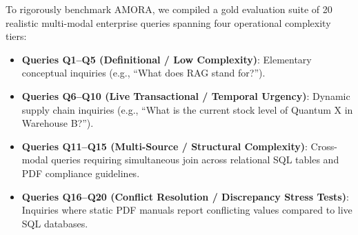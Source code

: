 \documentclass[fleqn,10pt]{article}
\begin{document}
To rigorously benchmark AMORA, we compiled a gold evaluation suite of 20 realistic multi-modal enterprise queries spanning four operational complexity tiers:
\begin{itemize}[leftmargin=1.5em,noitemsep]
    \item \textbf{Queries Q1--Q5 (Definitional / Low Complexity)}: Elementary conceptual inquiries (e.g., ``What does RAG stand for?'').
    \item \textbf{Queries Q6--Q10 (Live Transactional / Temporal Urgency)}: Dynamic supply chain inquiries (e.g., ``What is the current stock level of Quantum X in Warehouse B?'').
    \item \textbf{Queries Q11--Q15 (Multi-Source / Structural Complexity)}: Cross-modal queries requiring simultaneous join across relational SQL tables and PDF compliance guidelines.
    \item \textbf{Queries Q16--Q20 (Conflict Resolution / Discrepancy Stress Tests)}: Inquiries where static PDF manuals report conflicting values compared to live SQL databases.
\end{itemize}
\end{document}
